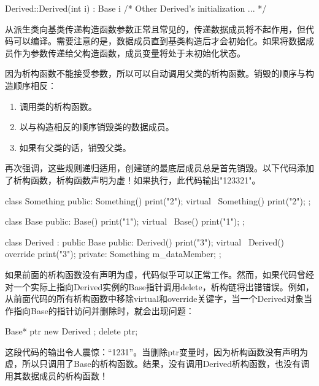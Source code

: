 \begin{cpp}
Derived::Derived(int i) : Base { i } { /* Other Derived's initialization ... */ }
\end{cpp}

从派生类向基类传递构造函数参数正常且常见的，传递数据成员将不起作用，但代码可以编译。需要注意的是，数据成员直到基类构造后才会初始化。如果将数据成员作为参数传递给父构造函数，成员变量将处于未初始化状态。


因为析构函数不能接受参数，所以可以自动调用父类的析构函数。销毁的顺序与构造顺序相反：

\begin{enumerate}
\item
调用类的析构函数。

\item
以与构造相反的顺序销毁类的数据成员。

\item
如果有父类的话，销毁父类。
\end{enumerate}

再次强调，这些规则递归适用，创建链的最底层成员总是首先销毁。以下代码添加了析构函数，析构函数声明为虚！如果执行，此代码输出"123321"。

\begin{cpp}
class Something
{
    public:
        Something() { print("2"); }
        virtual ~Something() { print("2"); }
};

class Base
{
    public:
        Base() { print("1"); }
        virtual ~Base() { print("1"); }
};

class Derived : public Base
{
    public:
        Derived() { print("3"); }
        virtual ~Derived() override { print("3"); }
    private:
        Something m_dataMember;
};
\end{cpp}

如果前面的析构函数没有声明为虚，代码似乎可以正常工作。然而，如果代码曾经对一个实际上指向Derived实例的Base指针调用delete，析构链将出错错误。例如，从前面代码的所有析构函数中移除virtual和override关键字，当一个Derived对象当作指向Base的指针访问并删除时，就会出现问题：

\begin{cpp}
Base* ptr { new Derived{} };
delete ptr;
\end{cpp}

这段代码的输出令人震惊：“1231”。当删除ptr变量时，因为析构函数没有声明为虚，所以只调用了Base的析构函数。结果，没有调用Derived析构函数，也没有调用其数据成员的析构函数！

